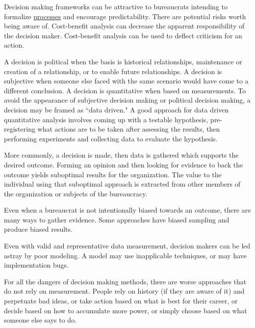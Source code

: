 Decision making frameworks can be attractive to bureaucrats intending to formalize 
\hyperref[sec:process]{processes} 
and encourage predictability. There are potential risks worth being aware of.  Cost-benefit analysis can decrease the apparent responsibility of the decision maker. Cost-benefit analysis can be used to deflect criticism for an action. 

A decision is political when the basis is historical relationships, maintenance or creation of a relationship, or to enable future relationships. A decision is subjective when someone else faced with the same scenario would have come to a different conclusion.
A decision is quantitative when based on measurements. To avoid the appearance of subjective decision making or political decision making, a decision may be framed as ``data driven." 
A good approach for data driven quantitative analysis involves coming up with a testable hypothesis, pre-registering what actions are to be taken after assessing the results, then performing experiments and collecting data to evaluate the hypothesis. 

More commonly, a decision is made, then data is gathered which supports the desired outcome. Forming an opinion and then looking for evidence to back the outcome yields suboptimal results for the organization. The value to the individual using that suboptimal approach is extracted from other members of the organization or subjects of the bureaucracy. 

Even when a bureaucrat is not intentionally biased towards an outcome, there are many ways to gather evidence. Some approaches have biased sampling and produce biased results.

Even with valid and representative data measurement, decision makers can be led astray by poor modeling. A model may use inapplicable techniques, or may have implementation bugs.

For all the dangers of decision making methods, there are worse approaches that do not rely on measurement. People rely on history (if they are aware of it) and perpetuate bad ideas, or take action based on what is best for their career, or decide based on how to accumulate more power, or simply choose based on what someone else says to do.  

